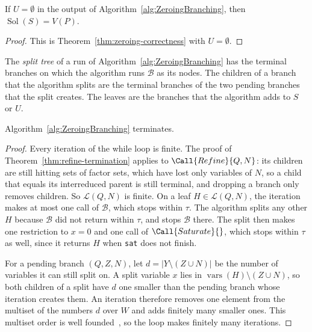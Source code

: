 \begin{corollary}
  \label{cor:zeroing-completeness}
  If $U=\emptyset$ in the output of Algorithm~\ref{alg:ZeroingBranching}, then
  $\operatorname{Sol}(S)=V(P)$.
\end{corollary}

\begin{proof}
  This is Theorem~\ref{thm:zeroing-correctness} with $U=\emptyset$.
\end{proof}

The \emph{split tree} of a run of Algorithm~\ref{alg:ZeroingBranching} has
the terminal branches on which the algorithm runs $\mathcal B$ as its nodes.
The children of a branch that the algorithm splits are the terminal branches
of the two pending branches that the split creates. The leaves are the
branches that the algorithm adds to $S$ or $U$.

\begin{theorem}
  \label{thm:zeroing-termination}
  Algorithm~\ref{alg:ZeroingBranching} terminates.
\end{theorem}

\begin{proof}
  Every iteration of the while loop is finite. The proof of
  Theorem~\ref{thm:refine-termination} applies to $\Call{Refine}{Q,N}$: its
  children are still hitting sets of factor sets, which have lost only
  variables of $N$, so a child that equals its interreduced parent is still
  terminal, and dropping a branch only removes children. So $\mathcal L(Q,N)$
  is finite. On a leaf $H\in\mathcal L(Q,N)$, the iteration makes at most one
  call of $\mathcal B$, which stops within $\tau$. The algorithm
  splits any other $H$ because $\mathcal B$ did not return within $\tau$, and
  stops $\mathcal B$ there. The split then makes one restriction to $x=0$ and
  one call of $\Call{Saturate}{}$, which stops within $\tau$ as well, since it
  returns $H$ when \texttt{sat} does not finish.

  For a pending branch $(Q,Z,N)$, let $d=|Y\setminus(Z\cup N)|$ be the number
  of variables it can still split on. A split variable $x$ lies in
  $\operatorname{vars}(H)\setminus(Z\cup N)$, so both children of a split have
  $d$ one smaller than the pending branch whose iteration creates them. An
  iteration therefore removes one element from the multiset of the numbers $d$
  over $W$ and adds finitely many smaller ones. This multiset order is well
  founded~\cite{dershowitz1979proving}, so the loop makes finitely many
  iterations.
\end{proof}

